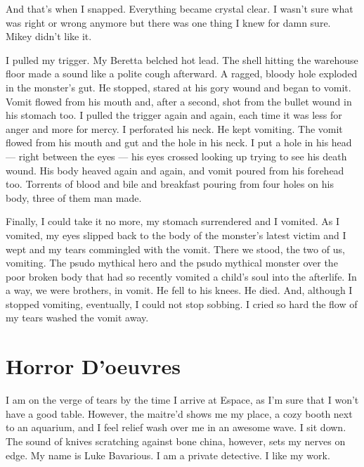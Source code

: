 And that's when I snapped. Everything became crystal clear. I
wasn't sure what was right or wrong anymore but there was one
thing I knew for damn sure. Mikey didn't like it.



I pulled my trigger. My Beretta belched hot lead. The shell hitting
the warehouse floor made a sound like a polite cough afterward. A
ragged, bloody hole exploded in the monster's gut. He
stopped, stared at his gory wound and began to vomit. Vomit flowed
from his mouth and, after a second, shot from the bullet wound in
his stomach too. I pulled the trigger again and again, each time it
was less for anger and more for mercy. I perforated his neck. He
kept vomiting. The vomit flowed from his mouth and gut and the hole
in his neck. I put a hole in his head --- right between the
eyes --- his eyes crossed looking up trying to see his death
wound. His body heaved again and again, and vomit poured from his
forehead too. Torrents of blood and bile and breakfast pouring from
four holes on his body, three of them man made.



Finally, I could take it no more, my stomach surrendered and I
vomited. As I vomited, my eyes slipped back to the body of the
monster's latest victim and I wept and my tears commingled
with the vomit. There we stood, the two of us, vomiting. The psudo
mythical hero and the psudo mythical monster over the poor broken
body that had so recently vomited a child's soul into the
afterlife. In a way, we were brothers, in vomit. He fell to his
knees. He died. And, although I stopped vomiting, eventually, I
could not stop sobbing. I cried so hard the flow of my tears washed
the vomit away. 
 





\chapter{Horror D'oeuvres}



I am on the verge of tears by the time I arrive at Espace, as
I'm sure that I won't have a good table. However, the
maitre'd shows me my place, a cozy booth next to an aquarium,
and I feel relief wash over me in an awesome wave. I sit down. The
sound of knives scratching against bone china, however, sets my
nerves on edge. My name is Luke Bavarious. I am a private
detective. I like my work.



